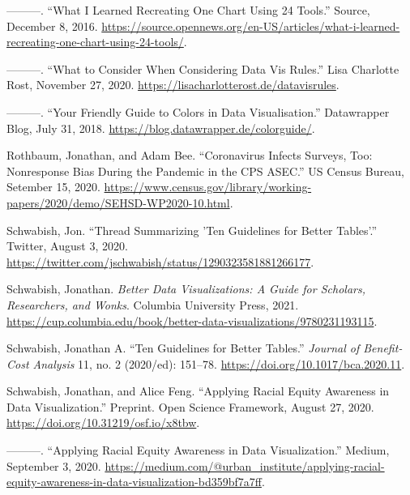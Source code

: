 \documentclass[
  english,
]{book}
\newlength{\cslhangindent}
\newlength{\cslentryspacingunit} %
\newenvironment{CSLReferences}[2] %
 {%
  \setlength{\parindent}{0pt}
  \ifodd #1
  \let\oldpar\par
  \def\par{\hangindent=\cslhangindent\oldpar}
  \fi
  \setlength{\parskip}{#2\cslentryspacingunit}
 }%
 {}
\begin{document}
\begin{CSLReferences}{1}{0}
\leavevmode{}%
---------. {``What {I Learned Recreating One Chart Using} 24 {Tools}.''} {Source}, December 8, 2016. \url{https://source.opennews.org/en-US/articles/what-i-learned-recreating-one-chart-using-24-tools/}.

\leavevmode{}%
---------. {``What to {Consider When Considering Data Vis Rules}.''} {Lisa Charlotte Rost}, November 27, 2020. \url{https://lisacharlotterost.de/datavisrules}.

\leavevmode{}%
---------. {``Your {Friendly Guide} to {Colors} in {Data Visualisation}.''} {Datawrapper Blog}, July 31, 2018. \url{https://blog.datawrapper.de/colorguide/}.

\leavevmode{}%
Rothbaum, Jonathan, and Adam Bee. {``Coronavirus {Infects Surveys}, {Too}: {Nonresponse Bias During} the {Pandemic} in the {CPS ASEC}.''} {US Census Bureau}, Setember 15, 2020. \url{https://www.census.gov/library/working-papers/2020/demo/SEHSD-WP2020-10.html}.

\leavevmode{}%
Schwabish, Jon. {``Thread {Summarizing} '{Ten Guidelines} for {Better Tables}'.''} {Twitter}, August 3, 2020. \url{https://twitter.com/jschwabish/status/1290323581881266177}.

\leavevmode{}%
Schwabish, Jonathan. \emph{Better {Data Visualizations}: {A Guide} for {Scholars}, {Researchers}, and {Wonks}}. {Columbia University Press}, 2021. \url{https://cup.columbia.edu/book/better-data-visualizations/9780231193115}.

\leavevmode{}%
Schwabish, Jonathan A. {``Ten {Guidelines} for {Better Tables}.''} \emph{Journal of Benefit-Cost Analysis} 11, no. 2 (2020/ed): 151--78. \url{https://doi.org/10.1017/bca.2020.11}.

\leavevmode{}%
Schwabish, Jonathan, and Alice Feng. {``Applying {Racial Equity Awareness} in {Data Visualization}.''} Preprint. {Open Science Framework}, August 27, 2020. \url{https://doi.org/10.31219/osf.io/x8tbw}.

\leavevmode{}%
---------. {``Applying {Racial Equity Awareness} in {Data Visualization}.''} {Medium}, September 3, 2020. \url{https://medium.com/@urban_institute/applying-racial-equity-awareness-in-data-visualization-bd359bf7a7ff}.


\end{CSLReferences}
\end{document}

